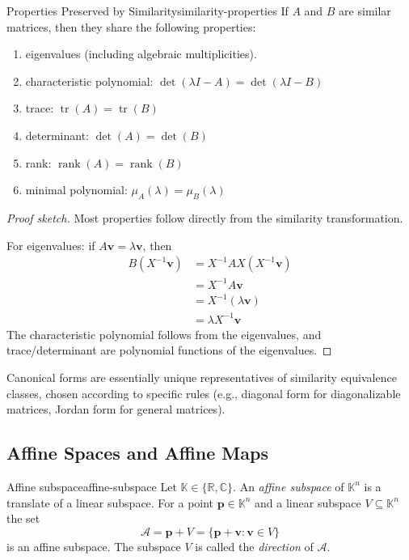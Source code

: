 \begin{theorem}{Properties Preserved by Similarity}{similarity-properties}
    If $A$ and $B$ are similar matrices, then they share the following properties:
    \begin{enumerate}
        \item eigenvalues (including algebraic multiplicities).
        \item characteristic polynomial: $\det(\lambda I - A) = \det(\lambda I - B)$
        \item trace: $\operatorname{tr}(A) = \operatorname{tr}(B)$
        \item determinant: $\det(A) = \det(B)$
        \item rank: $\operatorname{rank}(A) = \operatorname{rank}(B)$
        \item minimal polynomial: $\mu_A(\lambda) = \mu_B(\lambda)$
    \end{enumerate}
\end{theorem}

\begin{proof}[Proof sketch]
    Most properties follow directly from the similarity transformation.

    For eigenvalues: if $A\mathbf{v} = \lambda \mathbf{v}$, then
    \begin{align*}
        B(X^{-1}\mathbf{v}) & = X^{-1} A X(X^{-1}\mathbf{v}) \\
                            & = X^{-1} A \mathbf{v}          \\
                            & = X^{-1} (\lambda \mathbf{v})  \\
                            & = \lambda X^{-1} \mathbf{v}
    \end{align*}
    The characteristic polynomial follows from the eigenvalues, and trace/determinant are polynomial functions of the eigenvalues.
\end{proof}

Canonical forms are essentially unique representatives of similarity equivalence classes, chosen according to specific rules (e.g., diagonal form for diagonalizable matrices, Jordan form for general matrices).

\subsection{Affine Spaces and Affine Maps}
\label{sec:affine-spaces}

\begin{definition}{Affine subspace}{affine-subspace}
    Let $\mathbb{K}\in\{\mathbb{R},\mathbb{C}\}$. An \emph{affine subspace} of $\mathbb{K}^n$ is a translate of a linear subspace.
    For a point $\mathbf{p}\in\mathbb{K}^n$ and a linear subspace $V\subseteq\mathbb{K}^n$ the set
    \[
        \mathcal{A}=\mathbf{p}+V=\{\mathbf{p}+\mathbf{v}:\mathbf{v}\in V\}
    \]
    is an affine subspace. The subspace $V$ is called the \emph{direction} of $\mathcal{A}$.
\end{definition}

